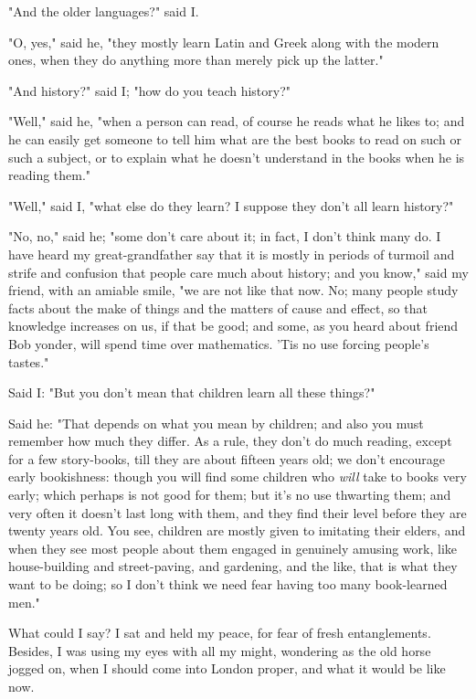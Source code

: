 "And the older languages?" said I.

"O, yes," said he, "they mostly learn Latin and Greek along with the
modern ones, when they do anything more than merely pick up the latter."

"And history?" said I; "how do you teach history?"

"Well," said he, "when a person can read, of course he reads what he
likes to; and he can easily get someone to tell him what are the best
books to read on such or such a subject, or to explain what he doesn't
understand in the books when he is reading them."

"Well," said I, "what else do they learn? I suppose they don't all learn
history?"

"No, no," said he; "some don't care about it; in fact, I don't think
many do. I have heard my great-grandfather say that it is mostly in
periods of turmoil and strife and confusion that people care much about
history; and you know," said my friend, with an amiable smile, "we are
not like that now. No; many people study facts about the make of things
and the matters of cause and effect, so that knowledge increases on us,
if that be good; and some, as you heard about friend Bob yonder, will
spend time over mathematics. 'Tis no use forcing people's tastes."

Said I: "But you don't mean that children learn all these things?"

Said he: "That depends on what you mean by children; and also you must
remember how much they differ. As a rule, they don't do much reading,
except for a few story-books, till they are about fifteen years old; we
don't encourage early bookishness: though you will find some children
who \emph{will} take to books very early; which perhaps is not good for
them; but it's no use thwarting them; and very often it doesn't last
long with them, and they find their level before they are twenty years
old. You see, children are mostly given to imitating their elders, and
when they see most people about them engaged in genuinely amusing work,
like house-building and street-paving, and gardening, and the like, that
is what they want to be doing; so I don't think we need fear having too
many book-learned men."

What could I say? I sat and held my peace, for fear of fresh
entanglements. Besides, I was using my eyes with all my might, wondering
as the old horse jogged on, when I should come into London proper, and
what it would be like now.

